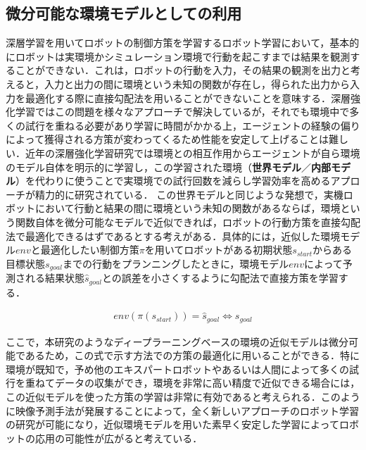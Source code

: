 \subsection{微分可能な環境モデルとしての利用}

  深層学習を用いてロボットの制御方策を学習するロボット学習において，基本的にロボットは実環境かシミュレーション環境で行動を起こすまでは結果を観測することができない．これは，ロボットの行動を入力，その結果の観測を出力と考えると，入力と出力の間に環境という未知の関数が存在し，得られた出力から入力を最適化する際に直接勾配法を用いることができないことを意味する．深層強化学習ではこの問題を様々なアプローチで解決しているが，それでも環境中で多くの試行を重ねる必要があり学習に時間がかかる上，エージェントの経験の偏りによって獲得される方策が変わってくるため性能を安定して上げることは難しい．近年の深層強化学習研究では環境との相互作用からエージェントが自ら環境のモデル自体を明示的に学習し，この学習された環境（{\bf 世界モデル}／{\bf 内部モデル}）\cite{ha1803world}を代わりに使うことで実環境での試行回数を減らし学習効率を高めるアプローチが精力的に研究されている．
  この世界モデルと同じような発想で，実機ロボットにおいて行動と結果の間に環境という未知の関数があるならば，環境という関数自体を微分可能なモデルで近似できれば，ロボットの行動方策を直接勾配法で最適化できるはずであるとする考えがある\cite{schmidhuber1990making}．具体的には，近似した環境モデル$env$と最適化したい制御方策$\pi$を用いてロボットがある初期状態$s_{start}$からある目標状態$s_{goal}$までの行動をプランニングしたときに，環境モデル$env$によって予測される結果状態$\hat{s}_{goal}$との誤差を小さくするように勾配法で直接方策を学習する．

  \begin{eqnarray}
    env(\pi(s_{start})) = \hat{s}_{goal} \Leftrightarrow s_{goal} \nonumber
  \end{eqnarray}

  ここで，本研究のようなディープラーニングベースの環境の近似モデルは微分可能であるため，この式で示す方法での方策の最適化に用いることができる．特に環境が既知で，予め他のエキスパートロボットやあるいは人間によって多くの試行を重ねてデータの収集ができ，環境を非常に高い精度で近似できる場合には，この近似モデルを使った方策の学習は非常に有効であると考えられる．このように映像予測手法が発展することによって，全く新しいアプローチのロボット学習の研究が可能になり，近似環境モデルを用いた素早く安定した学習によってロボットの応用の可能性が広がると考えている．
  
  
